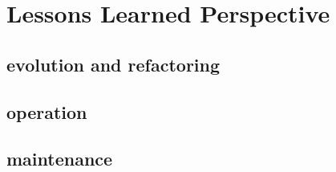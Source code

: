 \section{Lessons Learned Perspective}

\subsection{evolution and refactoring}

\subsection{operation}

\subsection{maintenance}